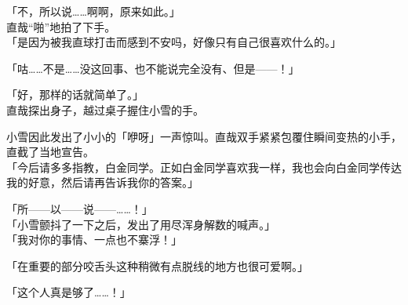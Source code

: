 「不，所以说……啊啊，原来如此。」\\

直哉“啪”地拍了下手。\\

「是因为被我直球打击而感到不安吗，好像只有自己很喜欢什么的。」

「咕……不是……没这回事、也不能说完全没有、但是——！」

「好，那样的话就简单了。」\\

直哉探出身子，越过桌子握住小雪的手。

小雪因此发出了小小的「咿呀」一声惊叫。直哉双手紧紧包覆住瞬间变热的小手，直截了当地宣告。\\

「今后请多多指教，白金同学。正如白金同学喜欢我一样，我也会向白金同学传达我的好意，然后请再告诉我你的答案。」

「所——以——说——……！」\\

「小雪颤抖了一下之后，发出了用尽浑身解数的喊声。」\\

「我对你的事情、一点也不寨浮！」

「在重要的部分咬舌头这种稍微有点脱线的地方也很可爱啊。」

「这个人真是够了……！」
